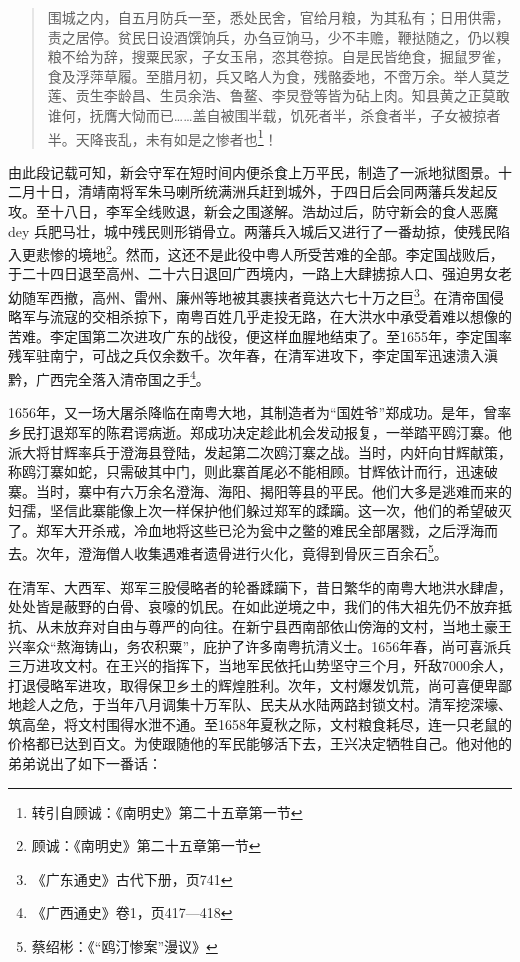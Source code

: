 \begin{quote}

围城之内，自五月防兵一至，悉处民舍，官给月粮，为其私有；日用供需，责之居停。贫民日设酒馔饷兵，办刍豆饷马，少不丰赡，鞭挞随之，仍以糗粮不给为辞，搜粟民家，子女玉帛，恣其卷掠。自是民皆绝食，掘鼠罗雀，食及浮萍草履。至腊月初，兵又略人为食，残骼委地，不啻万余。举人莫芝莲、贡生李龄昌、生员余浩、鲁鳌、李炅登等皆为砧上肉。知县黄之正莫敢谁何，抚膺大恸而已……盖自被围半载，饥死者半，杀食者半，子女被掠者半。天降丧乱，未有如是之惨者也\footnote{转引自顾诚：《南明史》第二十五章第一节}！

\end{quote}


由此段记载可知，新会守军在短时间内便杀食上万平民，制造了一派地狱图景。十二月十日，清靖南将军朱马喇所统满洲兵赶到城外，于四日后会同两藩兵发起反攻。至十八日，李军全线败退，新会之围遂解。浩劫过后，防守新会的食人恶魔dey 兵肥马壮，城中残民则形销骨立。两藩兵入城后又进行了一番劫掠，使残民陷入更悲惨的境地\footnote{顾诚：《南明史》第二十五章第一节}。然而，这还不是此役中粤人所受苦难的全部。李定国战败后，于二十四日退至高州、二十六日退回广西境内，一路上大肆掳掠人口、强迫男女老幼随军西撤，高州、雷州、廉州等地被其裹挟者竟达六七十万之巨\footnote{《广东通史》古代下册，页741}。在清帝国侵略军与流寇的交相杀掠下，南粤百姓几乎走投无路，在大洪水中承受着难以想像的苦难。李定国第二次进攻广东的战役，便这样血腥地结束了。至1655年，李定国率残军驻南宁，可战之兵仅余数千。次年春，在清军进攻下，李定国军迅速溃入滇黔，广西完全落入清帝国之手\footnote{《广西通史》卷1，页417—418}。

1656年，又一场大屠杀降临在南粤大地，其制造者为“国姓爷”郑成功。是年，曾率乡民打退郑军的陈君谔病逝。郑成功决定趁此机会发动报复，一举踏平鸥汀寨。他派大将甘辉率兵于澄海县登陆，发起第二次鸥汀寨之战。当时，内奸向甘辉献策，称鸥汀寨如蛇，只需破其中门，则此寨首尾必不能相顾。甘辉依计而行，迅速破寨。当时，寨中有六万余名澄海、海阳、揭阳等县的平民。他们大多是逃难而来的妇孺，坚信此寨能像上次一样保护他们躲过郑军的蹂躏。这一次，他们的希望破灭了。郑军大开杀戒，冷血地将这些已沦为瓮中之鳖的难民全部屠戮，之后浮海而去。次年，澄海僧人收集遇难者遗骨进行火化，竟得到骨灰三百余石\footnote{蔡绍彬：《“鸥汀惨案”漫议》}。

在清军、大西军、郑军三股侵略者的轮番蹂躏下，昔日繁华的南粤大地洪水肆虐，处处皆是蔽野的白骨、哀嚎的饥民。在如此逆境之中，我们的伟大祖先仍不放弃抵抗、从未放弃对自由与尊严的向往。在新宁县西南部依山傍海的文村，当地土豪王兴率众“熬海铸山，务农积粟”，庇护了许多南粤抗清义士。1656年春，尚可喜派兵三万进攻文村。在王兴的指挥下，当地军民依托山势坚守三个月，歼敌7000余人，打退侵略军进攻，取得保卫乡土的辉煌胜利。次年，文村爆发饥荒，尚可喜便卑鄙地趁人之危，于当年八月调集十万军队、民夫从水陆两路封锁文村。清军挖深壕、筑高垒，将文村围得水泄不通。至1658年夏秋之际，文村粮食耗尽，连一只老鼠的价格都已达到百文。为使跟随他的军民能够活下去，王兴决定牺牲自己。他对他的弟弟说出了如下一番话：

